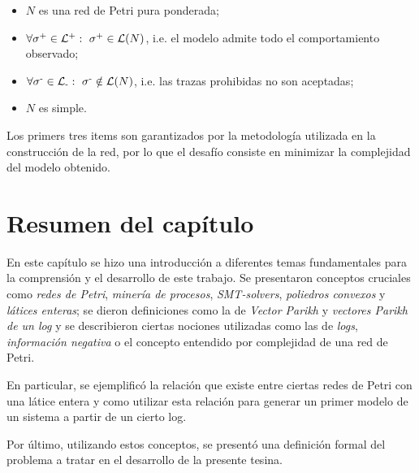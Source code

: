 \begin{itemize}
 \item $N$ es una red de Petri pura ponderada;
 \item $\forall \sigma\textsuperscript{+} \in {\mathcal L}\textsuperscript{+}:~ \sigma\textsuperscript{+} \in \mathcal{L}(N)$, i.e. el modelo admite todo el comportamiento observado;
 \item $\forall \sigma\textsuperscript{-} \in {\mathcal L}\textsubscript{-}:~ \sigma\textsuperscript{-} \notin \mathcal{L}(N)$, i.e. las trazas prohibidas no son aceptadas;
 \item $N$ es simple.\\
\end{itemize}

Los primers tres items son garantizados por la metodología utilizada
en la construcción de la red, por lo que el desafío consiste en minimizar la complejidad del modelo obtenido.

\section{Resumen del capítulo}
\label{sec:2.resumen}
En este capítulo se hizo una introducción a diferentes temas fundamentales para la comprensión y el desarrollo de este trabajo. 
Se presentaron conceptos cruciales como \textit{redes de Petri}, \textit{minería de procesos},
\textit{SMT-solvers}, \textit{poliedros convexos} y \textit{látices enteras}; se dieron definiciones como la de \textit{Vector Parikh} 
y \textit{vectores Parikh de un log} y se describieron ciertas nociones 
utilizadas como las de \textit{logs}, \textit{información negativa} 
o el concepto  entendido por complejidad de una red de Petri.

En particular, se ejemplificó la relación que existe entre ciertas redes de Petri con una látice entera y 
como utilizar esta relación para generar un primer modelo de un sistema a partir de un cierto log.

Por último, utilizando estos conceptos, se presentó una definición formal del problema a tratar en el desarrollo
 de la presente tesina. 
